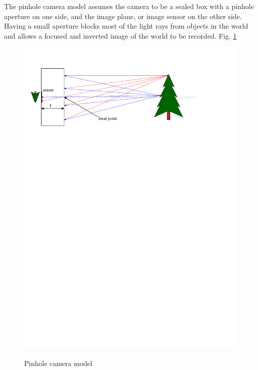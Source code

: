 The pinhole camera model assumes the camera to be a sealed box with a pinhole aperture on one side, and the image plane, or image sensor on the other side.  Having a small aperture blocks most of the light rays from objects in the world and allows a focused and inverted image of the world to be recorded. Fig. \ref{fig:pinhole_inverted}

\begin{figure}[h]
  \centering
    \includegraphics[width=1.0\textwidth]{chapters/images/pinhole_cam_1} \\
  \caption{Pinhole camera model}
  \label{fig:pinhole_inverted}
\end{figure}


